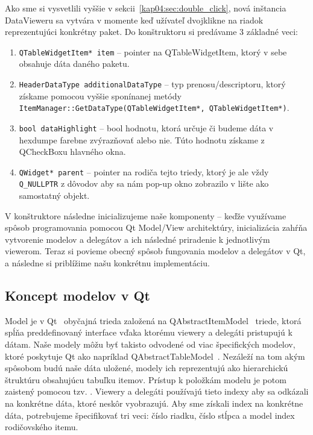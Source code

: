 Ako sme si vysvetlili vyššie v sekcii~\ref{kap04:sec:double_click}, nová inštancia DataVieweru sa vytvára v momente keď užívateľ dvojklikne na riadok reprezentujúci konkrétny paket. Do konštruktoru si predávame 3 základné veci:
\begin{enumerate}
\item \texttt{QTableWidgetItem* item} -- pointer na QTableWidgetItem, ktorý v sebe obsahuje dáta daného paketu.

\item \texttt{HeaderDataType additionalDataType} -- typ prenosu/descriptoru, ktorý získame pomocou vyššie sponínanej metódy \texttt{ItemManager::GetDataTy\-pe(QTableWidgetItem*, QTableWidgetItem*)}.

\item \texttt{bool dataHighlight} -- bool hodnotu, ktorá určuje či budeme dáta v hexdumpe farebne zvýrazňovať alebo nie. Túto hodnotu získame z QCheckBoxu hlavného okna.

\item \texttt{QWidget* parent} -- pointer na rodiča tejto triedy, ktorý je ale vždy \newline\texttt{Q\_NULLPTR} z dôvodov aby sa nám pop-up okno zobrazilo v lište ako samostatný objekt.
\end{enumerate}

V konštruktore následne inicializujeme naše komponenty -- keďže využívame spôsob programovania pomocou Qt Model/View architektúry, inicializácia zahŕňa vytvorenie modelov a delegátov a ich následné priradenie k jednotlivým viewerom. Teraz si povieme obecný spôsob fungovania modelov a delegátov v Qt, a následne si priblížime našu konkrétnu implementáciu.


\subsection{Koncept modelov v Qt}
Model je v Qt~\cite{qt_model} obyčajná trieda založená na QAbstractItemModel~\cite{qabstractitemmodel} triede, ktorá spĺňa preddefinovaný interface vďaka ktorému viewery a delegáti pristupujú k dátam. Naše modely môžu byť takisto odvodené od viac špecifických modelov, ktoré poskytuje Qt ako napríklad QAbstractTableModel~\cite{qabstracttablemodel}. Nezáleží na tom akým spôsobom budú naše dáta uložené, modely ich reprezentujú ako hierarchickú štruktúru obsahujúcu tabuľku itemov. Prístup k položkám modelu je potom zaistený pomocou tzv. . Viewery a delegáti používajú tieto indexy aby sa odkázali na konkrétne dáta, ktoré neskôr vyobrazujú. Aby sme získali index na konkrétne dáta, potrebujeme špecifikovať tri veci: číslo riadku, číslo stĺpca a model index rodičovského itemu.
